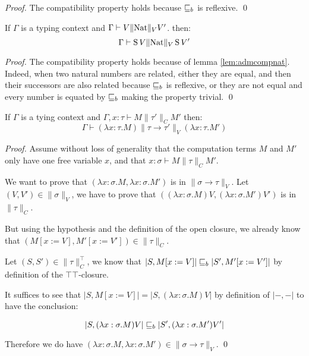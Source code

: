 \begin{proof}
The compatibility property holds 
because $\sqsubseteq_b$ is reflexive. 
\qed\end{proof}

\begin{lemma}
    If $\Gamma$ is a typing context and $\Gamma \vdash V \| \textnormal{Nat} \|_V V'$. 
    then:
    \begin{equation*}
        \Gamma \vdash \operatorname{S} V \| \textnormal{Nat} \|_V \operatorname{S} V'
    \end{equation*}
\end{lemma}
\begin{proof}
The compatibility property
holds because of lemma \ref{lem:admcompnat}. Indeed, 
when two natural numbers are related, either they 
are equal, and then their successors are also related 
because $\sqsubseteq_b$ is reflexive, or they are not 
equal and every number is equated by $\sqsubseteq_b$ 
making the property trivial. 
\qed\end{proof}

\begin{lemma}
    If $\Gamma$ is a tying context and 
    $\Gamma, x :\tau \vdash M \| \tau' \|_C M'$ then:
    \begin{equation*}
        \Gamma \vdash (\lambda x:\tau. M) \| \tau \to \tau' \|_V (\lambda
        x:\tau. M')
    \end{equation*}
\end{lemma}
\begin{proof}
Assume without loss of generality 
that the computation terms 
$M$ and $M'$ only have one free variable $x$,
and that $x : \sigma \vdash M \| \tau \|_C M'$.

We want to prove that $(\lambda x:\sigma .M, \lambda x:\sigma. M')$
is in $\| \sigma \to \tau\|_V$. Let $(V,V') \in \| \sigma \|_V$,
we have to prove that $((\lambda x:\sigma. M)V, (\lambda x:\sigma.
M')V')$ is in $\| \tau \|_C$.

But using the hypothesis and 
the definition of the open closure, 
we already know that 
$(M[x := V], M'[x := V']) \in \| \tau \|_C$.

Let $(S,S') \in \| \tau \|_C^\top$, we know that 
$|S, M[x := V]| \sqsubseteq_b |S', M'[x := V']|$ by definition 
of the $\top\top$-closure. 

It suffices to see that $|S, M[x := V]| = |S, (\lambda x:\sigma. M)
V|$ by definition of $|-,-|$ to have the conclusion:

\begin{equation*}
    | S, (\lambda x:\sigma. M) V| \sqsubseteq_b |S', (\lambda x:\sigma.
    M') V'| 
\end{equation*}

Therefore we do have $(\lambda x:\sigma. M, \lambda x:\sigma. M')
\in \| \sigma \to \tau \|_V$.
\qed\end{proof}

